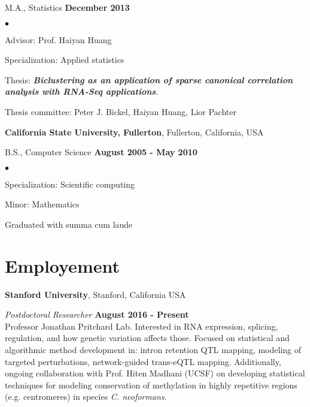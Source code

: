\documentclass[overlapped]{res}
\newenvironment{list2}{
  \begin{list}{$\bullet$}{%
      \setlength{\itemsep}{0in}
      \setlength{\parsep}{0in} \setlength{\parskip}{0in}
      \setlength{\topsep}{0in} \setlength{\partopsep}{0in}
      \setlength{\leftmargin}{0.2in}}}{\end{list}}
\begin{document}
\begin{resume}
M.A., Statistics \hfill {\bf
 December 2013}\\
\vspace{-.45cm}
\begin{list2}
\vspace*{1mm}
\item Advisor: Prof. Haiyan Huang
\item Specialization: Applied statistics
\item Thesis: \textit{\textbf{Biclustering as an application of sparse canonical correlation analysis with RNA-Seq applications}}.
\item Thesis committee: Peter J. Bickel, Haiyan Huang, Lior Pachter
\end{list2}



{\bf California State University, Fullerton}, Fullerton, California, USA

\vspace{-.3cm}
B.S., Computer Science \hfill {\bf August 2005 - May 2010}\\
\vspace{-.45cm}
\begin{list2}
\vspace*{1mm}
\item Specialization: Scientific computing
\item Minor: Mathematics
\item Graduated with summa cum laude
\end{list2}

\section{\sc Employement}

{\bf Stanford University}, Stanford, California USA
\vspace{-.3cm}

{\em Postdoctoral Researcher} \hfill {\bf August 2016 - Present}\\
Professor Jonathan Pritchard Lab.
Interested in RNA expression, splicing, regulation, and how genetic variation affects those.
Focused on statistical and algorithmic method development in: intron retention QTL mapping, modeling of targeted perturbations, network-guided trans-eQTL mapping.
Additionally, ongoing collaboration with Prof. Hiten Madhani (UCSF) on developing statistical techniques for modeling conservation of methylation in highly repetitive regions (e.g. centromeres) in species \textit{C. neoformans}.


\end{resume}
\end{document}
